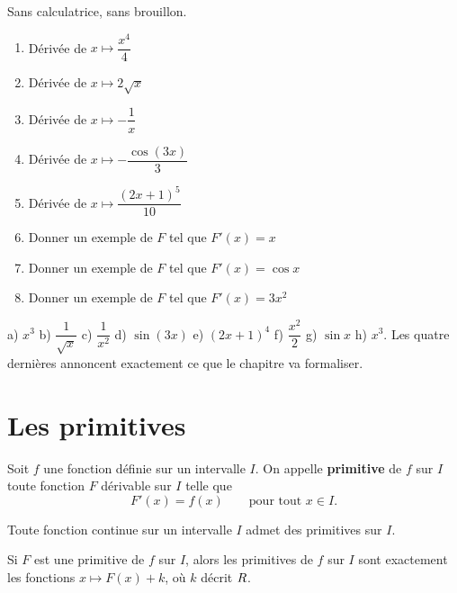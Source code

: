 \begin{automatismes}
Sans calculatrice, sans brouillon.

\begin{enumerate}[label=\textbf{\alph*)}, leftmargin=*, itemsep=0.25em]
  \item Dérivée de $x \mapsto \dfrac{x^{4}}{4}$
  \item Dérivée de $x \mapsto 2\sqrt{x}$
  \item Dérivée de $x \mapsto -\dfrac{1}{x}$
  \item Dérivée de $x \mapsto -\dfrac{\cos(3x)}{3}$
  \item Dérivée de $x \mapsto \dfrac{(2x+1)^{5}}{10}$
  \item Donner un exemple de $F$ tel que $F'(x)=x$
  \item Donner un exemple de $F$ tel que $F'(x)=\cos x$
  \item Donner un exemple de $F$ tel que $F'(x)=3x^{2}$
\end{enumerate}
\end{automatismes}

\begin{corrige}[automatismes]
a) $x^{3}$ \quad b) $\dfrac{1}{\sqrt{x}}$ \quad c) $\dfrac{1}{x^{2}}$ \quad
d) $\sin(3x)$ \quad e) $(2x+1)^{4}$ \quad f) $\dfrac{x^{2}}{2}$ \quad
g) $\sin x$ \quad h) $x^{3}$. Les quatre dernières annoncent exactement ce que
le chapitre va formaliser.
\end{corrige}

\section{Les primitives}

\begin{definition}[primitive]
Soit $f$ une fonction définie sur un intervalle $I$. On appelle
\textbf{primitive} de $f$ sur $I$ toute fonction $F$ dérivable sur $I$ telle
que
\[
  F'(x) = f(x) \qquad \text{pour tout } x \in I .
\]
\end{definition}

\begin{theoreme}[existence]
Toute fonction continue sur un intervalle $I$ admet des primitives sur $I$.
\end{theoreme}

\begin{theoreme}
Si $F$ est une primitive de $f$ sur $I$, alors les primitives de $f$ sur $I$
sont exactement les fonctions $x \mapsto F(x)+k$, où $k$ décrit $R$.
\end{theoreme}

